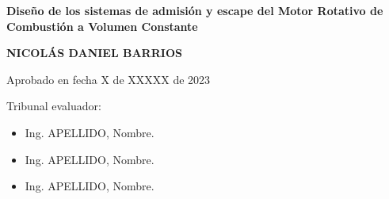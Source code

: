 \pagebreak
\begin{center}

\Large\textbf{{Diseño de los sistemas de admisión y escape del Motor Rotativo
    de Combustión a Volumen Constante \\}}

\vspace{3cm}

\large{\textbf{ NICOLÁS DANIEL BARRIOS }}\\
\vspace{3cm}
\end{center}

Aprobado en fecha X de XXXXX de 2023

\vspace{2cm}

Tribunal evaluador:

\begin{itemize}

\item Ing. APELLIDO, Nombre. %
\item Ing. APELLIDO, Nombre. %
\item Ing. APELLIDO, Nombre. %
\end{itemize}
